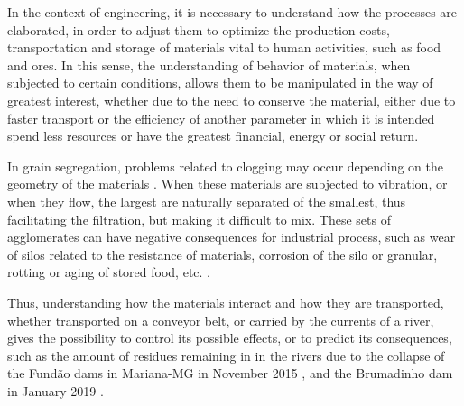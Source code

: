     In the context of engineering, it is necessary to understand how the processes are elaborated, in order to adjust them to optimize the production costs, transportation and storage of materials vital to human activities, such as food and ores. In this sense, the understanding of behavior of materials, when subjected to certain conditions, allows them to be manipulated in the way of greatest interest, whether due to the need to conserve the material, either due to faster transport or the efficiency of another parameter in which it is intended spend less resources or have the greatest financial, energy or social return.


    In grain segregation, problems related to clogging may occur depending on the geometry of the materials \cite{Caio-Tese}. When these materials are subjected to vibration, or when they flow, the largest are naturally separated of the smallest, thus facilitating the filtration, but making it difficult to mix. These sets of agglomerates can have negative consequences for industrial process, such as wear of silos related to the resistance of materials, corrosion of the silo or granular, rotting or aging of stored food, etc. \cite{Silo_failures}.


    Thus, understanding how the materials interact and how they are transported, whether transported on a conveyor belt, or carried by the currents of a river, gives the possibility to control its possible effects, or to predict its consequences, such as the amount of residues remaining in in the rivers due to the collapse of the Fundão dams in Mariana-MG in November 2015 \cite{Mariana_en, Mariana_pt, Mariana_fr}, and the Brumadinho dam in January 2019 \cite{Brumadinho_en, Brumadinho_pt, Brumadinho_fr}.

